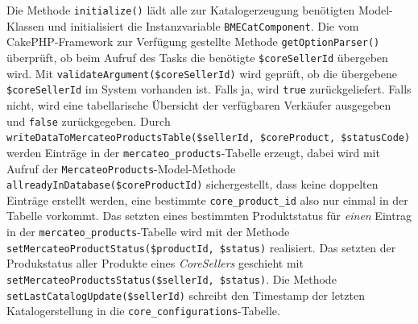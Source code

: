 	Die Methode \texttt{initialize()} lädt alle zur Katalogerzeugung benötigten Model-Klassen und initialisiert die Instanzvariable \texttt{BMECatComponent}.
	Die vom CakePHP-Framework zur Verfügung gestellte Methode \texttt{getOptionParser()} überprüft, ob beim Aufruf des Tasks die benötigte \texttt{\$coreSellerId} übergeben wird.
	Mit \texttt{validateArgument(\$coreSellerId)} wird geprüft, ob die übergebene \texttt{\$coreSellerId} im System vorhanden ist. Falls ja, wird \texttt{true} zurückgeliefert. Falls nicht, wird eine tabellarische Übersicht der verfügbaren Verkäufer ausgegeben und \texttt{false} zurückgegeben.
	Durch \texttt{writeDataToMercateoProductsTable(\$sellerId, \$coreProduct, \$statusCode)} werden Einträge in der \texttt{mercateo\_products}-Tabelle erzeugt, dabei wird mit Aufruf der \texttt{MercateoProducts}-Model-Methode \texttt{allreadyInDatabase(\$coreProductId)} sichergestellt, dass keine doppelten Einträge erstellt werden, eine bestimmte \texttt{core\_product\_id} also nur einmal in der Tabelle vorkommt. Das setzten eines bestimmten Produktstatus für \textit{einen} Eintrag in der \texttt{mercateo\_products}-Tabelle wird mit der Methode \texttt{setMercateoProductStatus(\$productId, \$status)} realisiert. Das setzten der Produkstatus aller Produkte eines \textit{CoreSellers} geschieht mit \texttt{setMercateoProductsStatus(\$sellerId, \$status)}.
	 Die Methode \texttt{setLastCatalogUpdate(\$sellerId)} schreibt den Timestamp der letzten Katalogerstellung in die \texttt{core\_configurations}-Tabelle.\\
	
